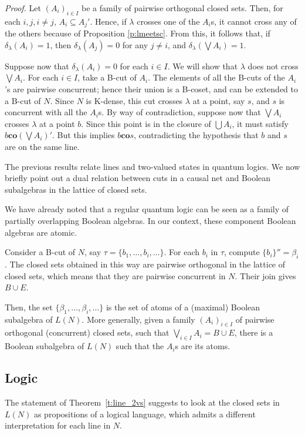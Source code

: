 \documentclass{eptcs}
\newcommand{\co}{\mathrel{\mathbf{co}}}
\newenvironment{proof}{\textit{Proof.}\quad}{\par\vspace{\baselineskip}\relax}
\begin{document}
\begin{proof}
  Let $(A_i)_{i \in I}$ be a family of pairwise orthogonal closed sets.
  Then, for each $i, j, i\not= j$, $A_i \subseteq A_j'$. Hence, if
  $\lambda$ crosses one of the $A_i$s, it cannot cross any of the
  others because of Proposition \ref{p:lmeetsc}.
  From this, it follows that,
  if $\delta_{\lambda}(A_i) = 1$, then $\delta_{\lambda}(A_j) = 0$
  for any $j \not= i$, and $\delta_{\lambda}(\bigvee A_i) = 1$.

  Suppose now that $\delta_{\lambda}(A_i) = 0$ for each $i \in I$.
  We will show that $\lambda$ does not cross $\bigvee A_i$.
  For each $i \in I$, take a B-cut of $A_i$. The elements of all the
  B-cuts of the $A_i$'s are pairwise
  concurrent; hence their union is a B-coset, and can be extended to
  a B-cut of $N$. Since $N$ is K-dense, this cut crosses $\lambda$ at
  a point, say $s$, and $s$ is concurrent with all the $A_i$s.
  By way of contradiction, suppose now that
  $\bigvee A_i$ crosses $\lambda$ at a point $b$. Since this point is
  in the closure of $\bigcup A_i$, it must satisfy $b \co (\bigvee A_i)'$.
  But this implies $b \co s$, contradicting the hypothesis that $b$
  and $s$ are on the same line.
\end{proof}
The previous results relate lines and two-valued states in
quantum logics. We now briefly point out a dual relation
between cuts in a causal net and Boolean subalgebras in the
lattice of closed sets.

We have already noted that a regular quantum logic can be
seen as a family of partially overlapping Boolean algebras.
In our context, these component Boolean algebras are atomic.

Consider a B-cut of $N$, say $\tau = \{b_1, \ldots, b_i, \ldots \}$.
For each $b_i$ in $\tau$, compute $\{ b_i \}'' = \beta_i$.
The closed sets obtained in this way are pairwise orthogonal
in the lattice of closed sets, which means that they are
pairwise concurrent in $N$. Their join gives $B \cup E$.

Then, the set $\{ \beta_1, \ldots, \beta_i, \ldots \}$ is the
set of atoms of a (maximal) Boolean subalgebra of $L(N)$.
More generally, given a family $(A_i)_{i \in I}$ of pairwise
orthogonal (concurrent) closed sets, such that
$\bigvee_{i \in I} A_i = B \cup E$, there is a Boolean
subalgebra of $L(N)$ such that the $A_i$s are its atoms.
\subsection{Logic}\label{s:logica}
The statement of Theorem~\ref{t:line_2vs} suggests to look at
the closed sets in $L(N)$ as propositions of a logical language,
which admits a different interpretation for each line in $N$.
\end{document}
